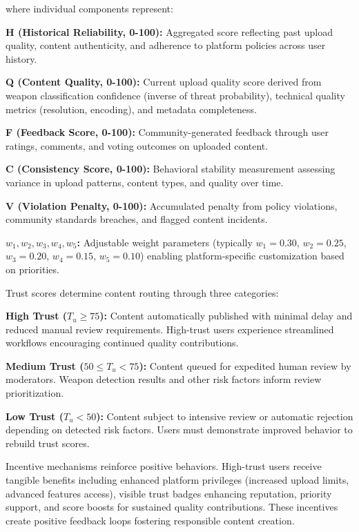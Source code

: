 \documentclass[conference]{IEEEtran}
\begin{document}
where individual components represent:

\textbf{H (Historical Reliability, 0-100):} Aggregated score reflecting past upload quality, content authenticity, and adherence to platform policies across user history.

\textbf{Q (Content Quality, 0-100):} Current upload quality score derived from weapon classification confidence (inverse of threat probability), technical quality metrics (resolution, encoding), and metadata completeness.

\textbf{F (Feedback Score, 0-100):} Community-generated feedback through user ratings, comments, and voting outcomes on uploaded content.

\textbf{C (Consistency Score, 0-100):} Behavioral stability measurement assessing variance in upload patterns, content types, and quality over time.

\textbf{V (Violation Penalty, 0-100):} Accumulated penalty from policy violations, community standards breaches, and flagged content incidents.

\textbf{$w_1, w_2, w_3, w_4, w_5$:} Adjustable weight parameters (typically $w_1=0.30$, $w_2=0.25$, $w_3=0.20$, $w_4=0.15$, $w_5=0.10$) enabling platform-specific customization based on priorities.

Trust scores determine content routing through three categories:

\textbf{High Trust ($T_u \geq 75$):} Content automatically published with minimal delay and reduced manual review requirements. High-trust users experience streamlined workflows encouraging continued quality contributions.

\textbf{Medium Trust ($50 \leq T_u < 75$):} Content queued for expedited human review by moderators. Weapon detection results and other risk factors inform review prioritization.

\textbf{Low Trust ($T_u < 50$):} Content subject to intensive review or automatic rejection depending on detected risk factors. Users must demonstrate improved behavior to rebuild trust scores.

Incentive mechanisms reinforce positive behaviors. High-trust users receive tangible benefits including enhanced platform privileges (increased upload limits, advanced features access), visible trust badges enhancing reputation, priority support, and score boosts for sustained quality contributions. These incentives create positive feedback loops fostering responsible content creation.
\end{document}

